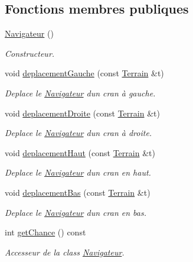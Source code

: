 \subsection*{Fonctions membres publiques}
\begin{DoxyCompactItemize}
\item 
\hyperlink{class_navigateur_a4a85323eec03cc4c708d6769bc25913f}{Navigateur} ()
\begin{DoxyCompactList}\small\item\em Constructeur. \end{DoxyCompactList}\item 
void \hyperlink{class_navigateur_ad70bb3a8f49254b3e1415b5fabc79473}{deplacement\+Gauche} (const \hyperlink{class_terrain}{Terrain} \&t)
\begin{DoxyCompactList}\small\item\em Deplace le \hyperlink{class_navigateur}{Navigateur} d\textquotesingle{}un cran à gauche. \end{DoxyCompactList}\item 
void \hyperlink{class_navigateur_a1cf57edc86607b309dd2ff77a6ebf535}{deplacement\+Droite} (const \hyperlink{class_terrain}{Terrain} \&t)
\begin{DoxyCompactList}\small\item\em Deplace le \hyperlink{class_navigateur}{Navigateur} d\textquotesingle{}un cran à droite. \end{DoxyCompactList}\item 
void \hyperlink{class_navigateur_a87c978de070d8fb88ea14c4383009246}{deplacement\+Haut} (const \hyperlink{class_terrain}{Terrain} \&t)
\begin{DoxyCompactList}\small\item\em Deplace le \hyperlink{class_navigateur}{Navigateur} d\textquotesingle{}un cran en haut. \end{DoxyCompactList}\item 
void \hyperlink{class_navigateur_a0b8f8dff62930f05df3f8ab758396286}{deplacement\+Bas} (const \hyperlink{class_terrain}{Terrain} \&t)
\begin{DoxyCompactList}\small\item\em Deplace le \hyperlink{class_navigateur}{Navigateur} d\textquotesingle{}un cran en bas. \end{DoxyCompactList}\item 
int \hyperlink{class_navigateur_a02507fc847204a3650378b76072b3e30}{get\+Chance} () const
\begin{DoxyCompactList}\small\item\em Accesseur de la class \hyperlink{class_navigateur}{Navigateur}. \end{DoxyCompactList}\item 

\end{DoxyCompactItemize}
